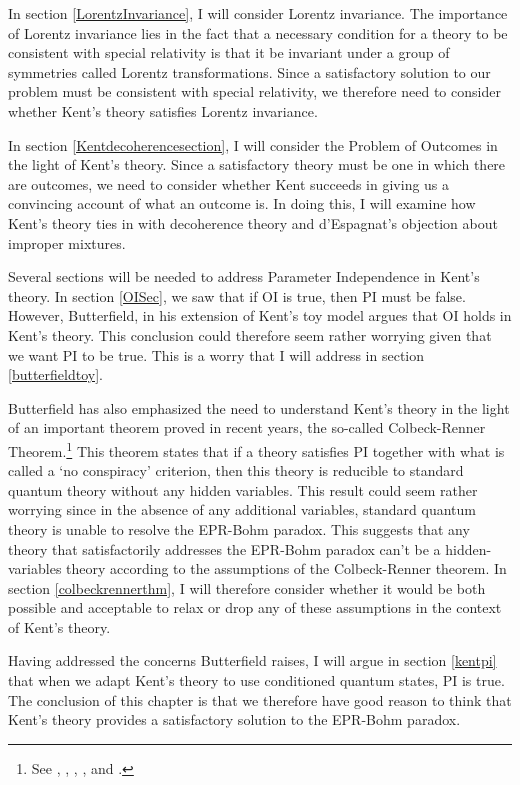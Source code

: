 \documentclass[12pt]{report}
\begin{document}
In section \ref{LorentzInvariance}, I will consider Lorentz invariance. The importance of Lorentz invariance lies in the fact that a necessary condition for a theory to be consistent with special relativity is that it be invariant under a group of symmetries called Lorentz transformations. Since a satisfactory solution to our problem must be consistent with special relativity, we therefore need to consider whether Kent's theory satisfies Lorentz invariance. 

In section \ref{Kentdecoherencesection}, I will consider the Problem of Outcomes in the light of Kent's theory. Since a satisfactory theory must be one in which there are outcomes, we need to consider whether Kent succeeds in giving us a convincing account of what an outcome is. In doing this, I will examine how Kent's theory ties in with decoherence theory and d'Espagnat's objection about improper mixtures. 

Several sections will be needed to address Parameter Independence in Kent's theory. In section \ref{OISec}, we saw that if OI is true, then PI must be false. However, Butterfield, in his extension of Kent's toy model argues that OI holds in Kent's theory. This  conclusion could therefore seem rather worrying given that we want PI to be true. This is a worry that I will address in section  \ref{butterfieldtoy}.

Butterfield has also emphasized the need to understand Kent's theory in the light of an important theorem proved in recent years, the so-called Colbeck-Renner Theorem.\footnote{See \cite{LeegwaterGijs2016Aitf}, \cite{ColbeckRoger2011Neoq}, \cite{ColbeckRoger2012Tcoq}, \cite{LandsmanK2015OtCt}, and \cite{Landsman}.} This theorem states that if a theory satisfies PI together with what is called a `no conspiracy' criterion, then this theory is reducible to standard quantum theory without any hidden variables. This result could seem rather worrying since in the absence of any additional variables, standard quantum theory is unable to resolve the EPR-Bohm paradox. This  suggests that any theory that satisfactorily addresses the  EPR-Bohm paradox can't be a hidden-variables theory according to the assumptions of the Colbeck-Renner theorem. In section \ref{colbeckrennerthm}, I will therefore consider whether it would be both possible and acceptable to relax or drop any of these assumptions in the context of Kent's theory.

Having addressed the concerns Butterfield raises,  I will argue in section \ref{kentpi} that when we adapt Kent's theory to use conditioned quantum states, PI is true. The conclusion of this chapter is that we therefore have good reason to think that Kent's theory provides a satisfactory solution to the EPR-Bohm paradox. 
\end{document}
